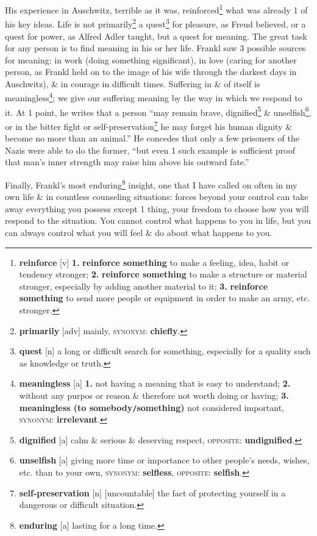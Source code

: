 \documentclass[oneside]{book}
\numberwithin{equation}{section}
\begin{document}
His experience in Auschwitz, terrible as it was, reinforced\footnote{\textbf{reinforce} [v] \textbf{1.} \textbf{reinforce something} to make a feeling, idea, habit or tendency stronger; \textbf{2.} \textbf{reinforce something} to make a structure or material stronger, especially by adding another material to it; \textbf{3.} \textbf{reinforce something} to send more people or equipment in order to make an army, etc. stronger.} what was already 1 of his key ideas. Life is not primarily\footnote{\textbf{primarily} [adv] mainly, \textsc{synonym}: \textbf{chiefly}.} a quest\footnote{\textbf{quest} [n] a long or difficult search for something, especially for a quality such as knowledge or truth.} for pleasure, as Freud believed, or a quest for power, as Alfred Adler taught, but a quest for meaning. The great task for any person is to find meaning in his or her life. Frankl saw 3 possible sources for meaning: in work (doing something significant), in love (caring for another person, as Frankl held on to the image of his wife through the darkest days in Auschwitz), \& in courage in difficult times. Suffering in \& of itself is meaningless\footnote{\textbf{meaningless} [a] \textbf{1.} not having a meaning that is easy to understand; \textbf{2.} without any purpos or reason \& therefore not worth doing or having; \textbf{3.} \textbf{meaningless (to somebody\texttt{/}something)} not considered important, \textsc{synonym}: \textbf{irrelevant}.}; we give our suffering meaning by the way in which we respond to it. At 1 point, he writes that a person ``may remain brave, dignified\footnote{\textbf{dignified} [a] calm \& serious \& deserving respect, \textsc{opposite}: \textbf{undignified}.} \& unselfish\footnote{\textbf{unselfish} [a] giving more time or importance to other people's needs, wishes, etc. than to your own, \textsc{synonym}: \textbf{selfless}, \textsc{opposite}: \textbf{selfish}.}, or in the bitter fight or self-preservation\footnote{\textbf{self-preservation} [n] [uncountable] the fact of protecting yourself in a dangerous or difficult situation.} he may forget his human dignity \& become no more than an animal.'' He concedes that only a few prisoners of the Nazis were able to do the former, ``but even 1 such example is sufficient proof that man's inner strength may raise him above his outward fate.''

Finally, Frankl's most enduring\footnote{\textbf{enduring} [a] lasting for a long time.} insight, one that I have called on often in my own life \& in countless counseling situations: forces beyond your control can take away everything you possess except 1 thing, your freedom to choose how you will respond to the situation. You cannot control what happens to you in life, but you can always control what you will feel \& do about what happens to you.
\end{document}
